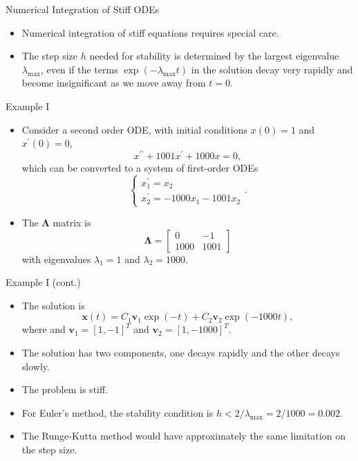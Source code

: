 \documentclass{beamer}
\begin{document}
\begin{frame}{Numerical Integration of Stiff ODEs}
    \begin{itemize}
    \item Numerical integration of stiff equations requires special care.
    \item The step size $h$
    needed for stability is determined by the largest eigenvalue $\lambda_{\max}$, even if the terms
    $\exp(-\lambda_{\max}t)$ in the solution decay very rapidly and become insignificant as we move away from $t=0$.
    \end{itemize}
\end{frame}
\begin{frame}{Example I}
    \begin{itemize}
        \item Consider a second order ODE, with initial conditions $x(0)=1$ and $x^{\prime}(0)=0$,
         \[
        x^{\prime \prime}+1001 x^{\prime}+1000 x=0,
        \]
        which can be converted to a system of first-order ODEs
        \[
        \left\{\begin{array}{l}
            x_1^{\prime}=x_2 \\
            x_2^{\prime}=-1000 x_1-1001 x_2
            \end{array}\right..
            \]
            
\item The $\boldsymbol{\Lambda}$ matrix is
\[  
\boldsymbol{\Lambda}=\left[\begin{array}{cc}
0 & -1 \\
1000 & 1001
\end{array}\right]
\]
with eigenvalues $\lambda_1=1$ and $\lambda_2=1000$.
\end{itemize}
\end{frame}
\begin{frame}{Example I (cont.)}
    \begin{itemize}
        \item The solution is
        \[
        \mathbf{x}(t)=C_1 \mathbf{v}_1 \exp(-t)+C_2 \mathbf{v}_2 \exp(-1000 t),
        \]
        where  and $\mathbf{v}_1=[1,-1]^T$ and $\mathbf{v}_2=[1, -1000]^T$.
        \item The solution has two components, one decays rapidly and the other decays slowly.
        \item The problem is stiff.
        \item For Euler's method, the stability condition is $h<2/\lambda_{\max}=2/1000=0.002$.
        \item The Runge-Kutta method would have approximately the same limitation on the step
        size.
    \end{itemize}

\end{frame}
\end{document}
